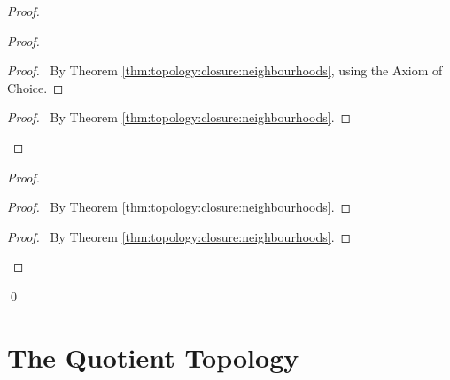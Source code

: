 \begin{proof}
  \pf
  \begin{proof}
    \begin{proof}
      \pf\ By Theorem \ref{thm:topology:closure:neighbourhoods}, using the
      Axiom of Choice.
    \end{proof}
    \qedstep
    \begin{proof}
      \pf\ By Theorem \ref{thm:topology:closure:neighbourhoods}.
    \end{proof}
  \end{proof}
  \begin{proof}
    \begin{proof}
      \pf\ By Theorem \ref{thm:topology:closure:neighbourhoods}.
    \end{proof}
    \qedstep
    \begin{proof}
      \pf\ By Theorem \ref{thm:topology:closure:neighbourhoods}.
    \end{proof}
  \end{proof}
  \qed
\end{proof}

\section{The Quotient Topology}

